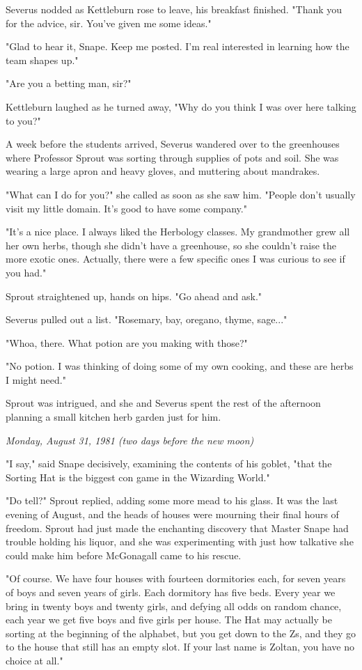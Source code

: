 Severus nodded as Kettleburn rose to leave, his breakfast finished. "Thank you for the advice, sir. You've given me some ideas."

"Glad to hear it, Snape. Keep me posted. I'm real interested in learning how the team shapes up."

"Are you a betting man, sir?"

Kettleburn laughed as he turned away, "Why do you think I was over here talking to you?"

A week before the students arrived, Severus wandered over to the greenhouses where Professor Sprout was sorting through supplies of pots and soil. She was wearing a large apron and heavy gloves, and muttering about mandrakes.

"What can I do for you?" she called as soon as she saw him. "People don't usually visit my little domain. It's good to have some company."

"It's a nice place. I always liked the Herbology classes. My grandmother grew all her own herbs, though she didn't have a greenhouse, so she couldn't raise the more exotic ones. Actually, there were a few specific ones I was curious to see if you had."

Sprout straightened up, hands on hips. "Go ahead and ask."

Severus pulled out a list. "Rosemary, bay, oregano, thyme, sage..."

"Whoa, there. What potion are you making with those?"

"No potion. I was thinking of doing some of my own cooking, and these are herbs I might need."

Sprout was intrigued, and she and Severus spent the rest of the afternoon planning a small kitchen herb garden just for him.

\emph{Monday, August 31, 1981 (two days before the new moon)}

"I say," said Snape decisively, examining the contents of his goblet, "that the Sorting Hat is the biggest con game in the Wizarding World."

"Do tell?" Sprout replied, adding some more mead to his glass. It was the last evening of August, and the heads of houses were mourning their final hours of freedom. Sprout had just made the enchanting discovery that Master Snape had trouble holding his liquor, and she was experimenting with just how talkative she could make him before McGonagall came to his rescue.

"Of course. We have four houses with fourteen dormitories each, for seven years of boys and seven years of girls. Each dormitory has five beds. Every year we bring in twenty boys and twenty girls, and defying all odds on random chance, each year we get five boys and five girls per house. The Hat may actually be sorting at the beginning of the alphabet, but you get down to the Zs, and they go to the house that still has an empty slot. If your last name is Zoltan, you have no choice at all."

